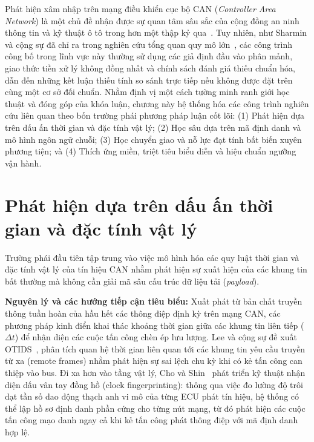 \documentclass[12pt, a4paper, reqno, oneside]{book}
\begin{document}
Phát hiện xâm nhập trên mạng điều khiển cục bộ CAN (\textit{Controller Area Network}) là một chủ đề nhận được sự quan tâm sâu sắc của cộng đồng an ninh thông tin và kỹ thuật ô tô trong hơn một thập kỷ qua~\cite{rajapaksha2023survey}. Tuy nhiên, như Sharmin và cộng sự đã chỉ ra trong nghiên cứu tổng quan quy mô lớn~\cite{sharmin2024benchmark}, các công trình công bố trong lĩnh vực này thường sử dụng các giả định đầu vào phân mảnh, giao thức tiền xử lý không đồng nhất và chính sách đánh giá thiếu chuẩn hóa, dẫn đến những kết luận thiếu tính so sánh trực tiếp nếu không được đặt trên cùng một cơ sở đối chuẩn. Nhằm định vị một cách tường minh ranh giới học thuật và đóng góp của khóa luận, chương này hệ thống hóa các công trình nghiên cứu liên quan theo bốn trường phái phương pháp luận cốt lõi: (1) Phát hiện dựa trên dấu ấn thời gian và đặc tính vật lý; (2) Học sâu dựa trên mã định danh và mô hình ngôn ngữ chuỗi; (3) Học chuyển giao và nỗ lực đạt tính bất biến xuyên phương tiện; và (4) Thích ứng miền, triệt tiêu biểu diễn và hiệu chuẩn ngưỡng vận hành.

\section{Phát hiện dựa trên dấu ấn thời gian và đặc tính vật lý}
Trường phái đầu tiên tập trung vào việc mô hình hóa các quy luật thời gian và đặc tính vật lý của tín hiệu CAN nhằm phát hiện sự xuất hiện của các khung tin bất thường mà không cần giải mã sâu cấu trúc dữ liệu tải (\textit{payload}).

\textbf{Nguyên lý và các hướng tiếp cận tiêu biểu:}
Xuất phát từ bản chất truyền thông tuần hoàn của hầu hết các thông điệp định kỳ trên mạng CAN, các phương pháp kinh điển khai thác khoảng thời gian giữa các khung tin liên tiếp ($\Delta t$) để nhận diện các cuộc tấn công chèn ép lưu lượng. Lee và cộng sự đề xuất OTIDS~\cite{lee2017otids}, phân tích quan hệ thời gian liên quan tới các khung tin yêu cầu truyền từ xa (remote frames) nhằm phát hiện sự sai lệch chu kỳ khi có kẻ tấn công can thiệp vào bus. Đi xa hơn vào tầng vật lý, Cho và Shin~\cite{cho2016fingerprint} phát triển kỹ thuật nhận diện dấu vân tay đồng hồ (clock fingerprinting): thông qua việc đo lường độ trôi dạt tần số dao động thạch anh vi mô của từng ECU phát tín hiệu, hệ thống có thể lập hồ sơ định danh phần cứng cho từng nút mạng, từ đó phát hiện các cuộc tấn công mạo danh ngay cả khi kẻ tấn công phát thông điệp với mã định danh hợp lệ.
\end{document}
